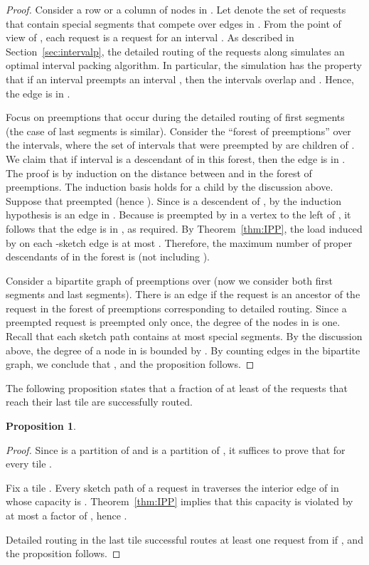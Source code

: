 \documentclass[11pt]{article}
\newtheorem{proposition}[theorem]{Proposition}
\newenvironment{proof sketch}[1]{\noindent {\emph{Proof sketch of #1:}}}{\hfill \qed}
\begin{document}
\begin{proof}
  Consider a row or a column  of nodes in . Let  denote the set of requests that contain special
  segments that compete over edges in . From the point of view of
  , each request  is a request for an interval
  .
  As described in Section~\ref{sec:intervalp}, the detailed routing of the requests  along   simulates an optimal interval packing algorithm. In
  particular, the simulation has the property that if an interval
   preempts an interval , then the intervals overlap
  and . Hence, the edge  is in .


  Focus on preemptions that occur during the detailed routing of first segments (the
  case of last segments is similar). Consider the ``forest of preemptions'' over the
  intervals, where the set of intervals that were preempted by  are children of
  .  We claim that if interval  is a descendant of  in this forest,
  then the edge  is in .  The proof is by induction on the distance
  between  and  in the forest of preemptions. The induction basis holds for
  a child  by the discussion above.  Suppose that  preempted  (hence
  ). Since  is a descendent of , by the induction hypothesis
   is an edge in . Because  is preempted by  in a vertex
  to the left of , it follows that the edge  is in , as
  required.  By Theorem~\ref{thm:IPP}, the load induced by  on each
  -sketch edge is at most .  Therefore, the maximum number of
  proper descendants of  in the forest is  (not including ).

  Consider a bipartite graph of preemptions over 
  (now we consider both first segments and last segments). There is an edge
   if the request  is an ancestor of the request  in the forest of preemptions corresponding to detailed
  routing. Since a preempted request is preempted only once, the degree of the nodes
  in  is one.  Recall that each sketch path contains at most 
  special segments.  By the discussion above, the degree of a node in  is
  bounded by . By counting edges in the bipartite graph, we conclude that , and the proposition follows.
\end{proof}

The following proposition states that a fraction of at least  of the requests
that reach their last tile are successfully routed.
\begin{proposition}\label{prop:last}\label{prop:Rs}
    
\end{proposition}

\begin{proof}
  Since  is a partition of  and   is a partition of , it suffices to prove
  that  for every tile .

  Fix a tile .  Every sketch path of a request in  traverses the interior
  edge of  in  whose capacity is . Theorem~\ref{thm:IPP} implies that
  this capacity is violated by at most a factor of , hence .

  Detailed routing in the last tile successful routes at least one request from
   if , and the proposition follows.
\end{proof}
\end{document}
